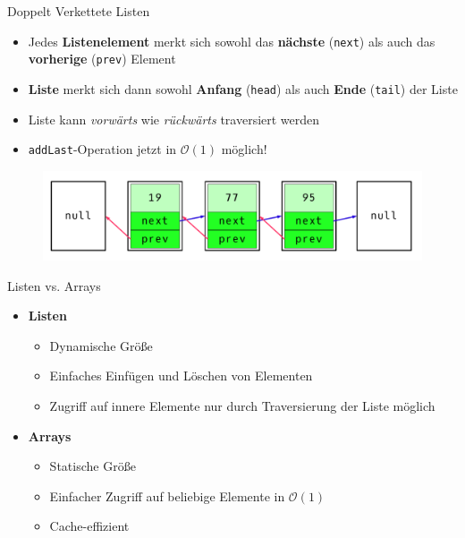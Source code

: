 \documentclass[18pt]{beamer}
\begin{document}
\begin{frame}{Doppelt Verkettete Listen}
    \begin{itemize}
        \item Jedes \textbf{Listenelement} merkt sich sowohl das \textbf{nächste} (\texttt{next}) als auch das \textbf{vorherige} (\texttt{prev}) Element
        \item \textbf{Liste} merkt sich dann sowohl \textbf{Anfang} (\texttt{head}) als auch \textbf{Ende} (\texttt{tail}) der Liste
        \item Liste kann \textit{vorwärts} wie \textit{rückwärts} traversiert werden
        \item \texttt{addLast}-Operation jetzt in $\mathcal{O}(1)$ möglich!
    \end{itemize}

    \begin{figure}
        \includegraphics[scale=.3]{img/doublelinkedlist.png}
    \end{figure}
\end{frame}

\begin{frame}{Listen vs. Arrays}
    \begin{itemize}
        \item \textbf{Listen}
        \begin{itemize}
            \item Dynamische Größe
            \item Einfaches Einfügen und Löschen von Elementen
            \item Zugriff auf innere Elemente nur durch Traversierung der Liste möglich
        \end{itemize}
        \item \textbf{Arrays}
        \begin{itemize}
            \item Statische Größe
            \item Einfacher Zugriff auf beliebige Elemente in $\mathcal{O}(1)$
            \item Cache-effizient
        \end{itemize}
    \end{itemize}
\end{frame}
\end{document}
